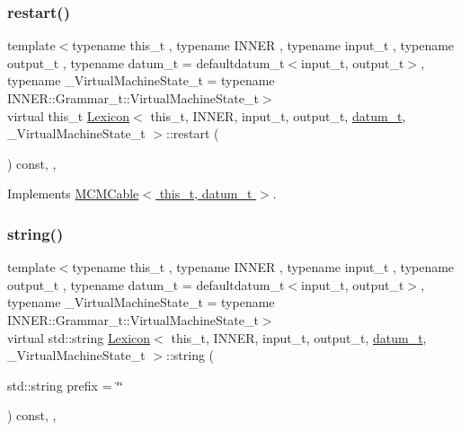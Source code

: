 \subsubsection{\texorpdfstring{restart()}{restart()}}
{\footnotesize\ttfamily template$<$typename this\+\_\+t , typename I\+N\+N\+ER , typename input\+\_\+t , typename output\+\_\+t , typename datum\+\_\+t  = defaultdatum\+\_\+t$<$input\+\_\+t, output\+\_\+t$>$, typename \+\_\+\+Virtual\+Machine\+State\+\_\+t  = typename I\+N\+N\+E\+R\+::\+Grammar\+\_\+t\+::\+Virtual\+Machine\+State\+\_\+t$>$ \\
virtual this\+\_\+t \hyperlink{class_lexicon}{Lexicon}$<$ this\+\_\+t, I\+N\+N\+ER, input\+\_\+t, output\+\_\+t, \hyperlink{class_bayesable_a9f1a6c0cd7855550fa10b1a8f13a5867}{datum\+\_\+t}, \+\_\+\+Virtual\+Machine\+State\+\_\+t $>$\+::restart (\begin{DoxyParamCaption}{ }\end{DoxyParamCaption}) const\hspace{0.3cm}{\ttfamily [inline]}, {\ttfamily [override]}, {\ttfamily [virtual]}}



Implements \hyperlink{class_m_c_m_cable_aa7017e18b4a1508bc4cff90fb82a8ec1}{M\+C\+M\+Cable$<$ this\+\_\+t, datum\+\_\+t $>$}.

\mbox{\label{class_lexicon_a94d839ba9055b7a8e859628828939ffb}} 
\subsubsection{\texorpdfstring{string()}{string()}}
{\footnotesize\ttfamily template$<$typename this\+\_\+t , typename I\+N\+N\+ER , typename input\+\_\+t , typename output\+\_\+t , typename datum\+\_\+t  = defaultdatum\+\_\+t$<$input\+\_\+t, output\+\_\+t$>$, typename \+\_\+\+Virtual\+Machine\+State\+\_\+t  = typename I\+N\+N\+E\+R\+::\+Grammar\+\_\+t\+::\+Virtual\+Machine\+State\+\_\+t$>$ \\
virtual std\+::string \hyperlink{class_lexicon}{Lexicon}$<$ this\+\_\+t, I\+N\+N\+ER, input\+\_\+t, output\+\_\+t, \hyperlink{class_bayesable_a9f1a6c0cd7855550fa10b1a8f13a5867}{datum\+\_\+t}, \+\_\+\+Virtual\+Machine\+State\+\_\+t $>$\+::string (\begin{DoxyParamCaption}\item[{std\+::string}]{prefix = {\ttfamily \char`\"{}\char`\"{}} }\end{DoxyParamCaption}) const\hspace{0.3cm}{\ttfamily [inline]}, {\ttfamily [override]}, {\ttfamily [virtual]}}


